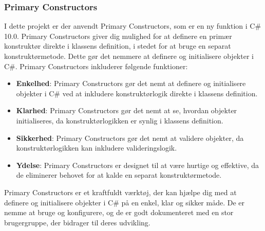 \subsubsection{Primary Constructors}
I dette projekt er der anvendt Primary Constructors, som er en ny funktion i C\# 10.0. Primary Constructors giver dig mulighed for at definere en primær konstruktør direkte i klassens definition, i stedet for at bruge en separat konstruktørmetode. Dette gør det nemmere at definere og initialisere objekter i C\#.
Primary Constructors inkluderer følgende funktioner:
\begin{itemize}
    \item \textbf{Enkelhed}: Primary Constructors gør det nemt at definere og initialisere objekter i C\# ved at inkludere konstruktørlogik direkte i klassens definition.
    \item \textbf{Klarhed}: Primary Constructors gør det nemt at se, hvordan objekter initialiseres, da konstruktørlogikken er synlig i klassens definition.
    \item \textbf{Sikkerhed}: Primary Constructors gør det nemt at validere objekter, da konstruktørlogikken kan inkludere valideringslogik.
    \item \textbf{Ydelse}: Primary Constructors er designet til at være hurtige og effektive, da de eliminerer behovet for at kalde en separat konstruktørmetode.
\end{itemize}
Primary Constructors er et kraftfuldt værktøj, der kan hjælpe dig med at definere og initialisere objekter i C\# på en enkel, klar og sikker måde. De er nemme at bruge og konfigurere, og de er godt dokumenteret med en stor brugergruppe, der bidrager til deres udvikling.

